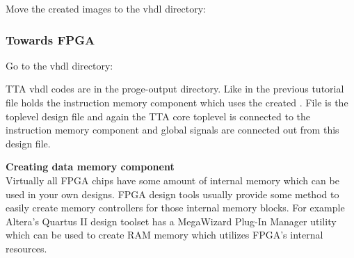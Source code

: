 \documentclass[twoside]{tceusermanual}
\begin{document}
Move the created images to the vhdl directory:



\subsubsection{Towards FPGA}
Go to the vhdl directory:


TTA vhdl codes are in the proge-output directory. Like in the previous
tutorial file  holds the instruction memory
component which uses the created . File
 is the toplevel design file and again the
TTA core toplevel is connected to the instruction memory component and global
signals are connected out from this design file.

\textbf{Creating data memory component} \\
Virtually all FPGA chips have some amount of internal memory which can be used
in your own designs. FPGA design tools usually provide some method to easily
create memory controllers for those internal memory blocks. For example
Altera's Quartus II design toolset has a MegaWizard Plug-In Manager utility
which can be used to create RAM memory which utilizes FPGA's internal
resources.
\end{document}
